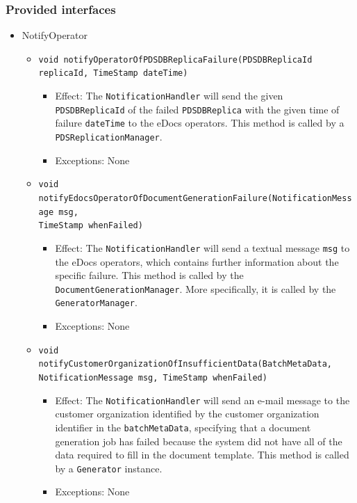 \documentclass[a4paper,10pt]{article}
\begin{document}
\subsubsection*{Provided interfaces}
\begin{itemize}
    \item NotifyOperator
    \begin{itemize}
        \item \texttt{void notifyOperatorOfPDSDBReplicaFailure(PDSDBReplicaId replicaId, TimeStamp dateTime)}
        \begin{itemize}
            \item Effect: The \texttt{NotificationHandler} will send the given \texttt{PDSDBReplicaId} of the failed \texttt{PDSDBReplica} with the given time of failure \texttt{dateTime} to the eDocs operators. This method is called by a \texttt{PDSReplicationManager}.
            \item Exceptions: None
        \end{itemize}
        
        \item \texttt{void notifyEdocsOperatorOfDocumentGenerationFailure(NotificationMessage msg,\\ TimeStamp whenFailed)}
        \begin{itemize}
            \item Effect: The \texttt{NotificationHandler} will send a textual message \texttt{msg} to the eDocs operators, which contains further information about the specific failure. This method is called by the \texttt{DocumentGenerationManager}. More specifically, it is called by the \texttt{GeneratorManager}.
            \item Exceptions: None
        \end{itemize}
        
        \item \texttt{void notifyCustomerOrganizationOfInsufficientData(BatchMetaData, NotificationMessage msg, TimeStamp whenFailed)}
        \begin{itemize}
            \item Effect: The \texttt{NotificationHandler} will send an e-mail message to the customer organization identified by the customer organization identifier in the \texttt{batchMetaData}, specifying that a document generation job has failed because the system did not have all of the data required to fill in the document template. This method is called by a \texttt{Generator} instance.
            \item Exceptions: None
        \end{itemize}        
        
    \end{itemize}
\end{itemize}
\end{document}
